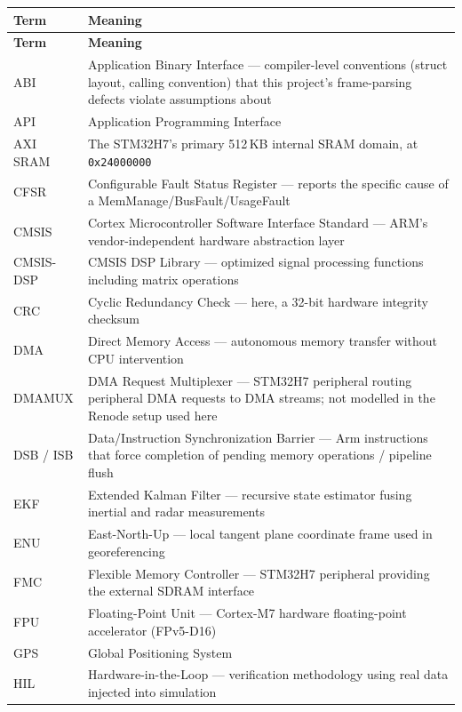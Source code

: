 
\begin{longtable}{@{}p{3.2cm}p{10.8cm}@{}}
\toprule
\textbf{Term} & \textbf{Meaning} \\
\midrule
\endfirsthead
\toprule
\textbf{Term} & \textbf{Meaning} \\
\midrule
\endhead
ABI & Application Binary Interface --- compiler-level conventions (struct layout, calling convention) that this project's frame-parsing defects violate assumptions about \\
API & Application Programming Interface \\
AXI SRAM & The STM32H7's primary 512\,KB internal SRAM domain, at \texttt{0x24000000} \\
CFSR & Configurable Fault Status Register --- reports the specific cause of a MemManage/BusFault/UsageFault \\
CMSIS & Cortex Microcontroller Software Interface Standard --- ARM's vendor-independent hardware abstraction layer \\
CMSIS-DSP & CMSIS DSP Library --- optimized signal processing functions including matrix operations \\
CRC & Cyclic Redundancy Check --- here, a 32-bit hardware integrity checksum \\
DMA & Direct Memory Access --- autonomous memory transfer without CPU intervention \\
DMAMUX & DMA Request Multiplexer --- STM32H7 peripheral routing peripheral DMA requests to DMA streams; not modelled in the Renode setup used here \\
DSB / ISB & Data/Instruction Synchronization Barrier --- Arm instructions that force completion of pending memory operations / pipeline flush \\
EKF & Extended Kalman Filter --- recursive state estimator fusing inertial and radar measurements \\
ENU & East-North-Up --- local tangent plane coordinate frame used in georeferencing \\
FMC & Flexible Memory Controller --- STM32H7 peripheral providing the external SDRAM interface \\
FPU & Floating-Point Unit --- Cortex-M7 hardware floating-point accelerator (FPv5-D16) \\
GPS & Global Positioning System \\
HIL & Hardware-in-the-Loop --- verification methodology using real data injected into simulation \\

\end{longtable}
